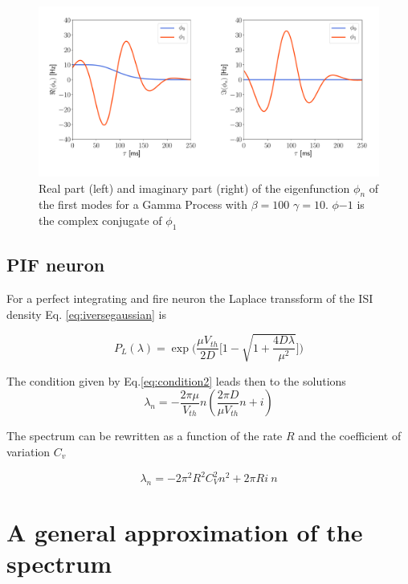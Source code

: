 \documentclass[a4paper,11pt,twoside]{article}
\numberwithin{equation}{section}
\begin{document}
\begin{figure}[h!]
	\centering
	\includegraphics[width=0.8\linewidth]{gamma_eigenfunction.pdf}
	\caption{Real part (left) and imaginary part (right) of the eigenfunction $\phi_n$ of the first modes for a Gamma Process with $\beta=100$
		$\gamma=10$. $\phi{-1}$ is the complex conjugate of  $\phi_{1}$}
	\label{fig:gammaeigenfunction}
\end{figure}



\subsection{PIF neuron}

For a perfect integrating and  fire neuron the Laplace transsform of the ISI density Eq. \eqref{eq:iversegaussian} is

\begin{equation}
P_L(\lambda)=\exp\big(\frac{\mu V_{th}}{2D}\big[1-\sqrt{1+\frac{4D\lambda}{\mu^2}}\big]\big)
\end{equation}



The condition given by Eq.\eqref{eq:condition2} leads then to the solutions
\begin{equation}
 \lambda_n=- \frac{2\pi\mu}{V_{th}}n( \frac{2\pi D}{\mu V_{th}}n + i)
\end{equation}

The spectrum can be rewritten as a function of the rate $R$ and the coefficient of variation $C_v$

\begin{equation}
\lambda_n=- 2\pi^2R^2C_V^2n^2+2\pi R i\:n
\end{equation}

\section{A general approximation of the spectrum}
\end{document}
